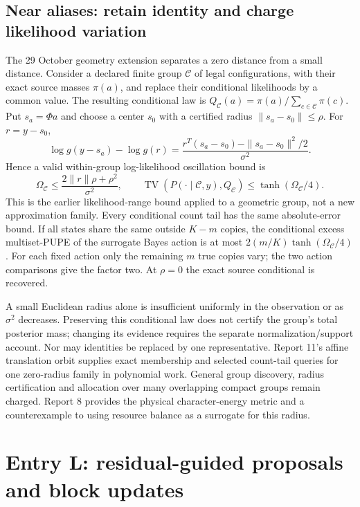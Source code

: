 \documentclass[10pt,a4paper]{article}
\newcommand{\TV}{\operatorname{TV}}
\begin{document}
\subsection{Near aliases: retain identity and charge likelihood variation}
The 29 October geometry extension separates a zero distance from a small distance. Consider a declared
finite group $\mathcal C$ of legal configurations, with their exact source masses $\pi(a)$, and replace
their conditional likelihoods by a common value. The resulting conditional law is
$Q_{\mathcal C}(a)=\pi(a)/\sum_{c\in\mathcal C}\pi(c)$. Put $s_a=\Phi a$ and choose a center $s_0$
with a certified radius $\|s_a-s_0\|\leq\rho$. For $r=y-s_0$,
\[
 \log g(y-s_a)-\log g(r)
 =\frac{r^T(s_a-s_0)-\|s_a-s_0\|^2/2}{\sigma^2}.
\]
Hence a valid within-group log-likelihood oscillation bound is
\begin{equation}
 \Omega_{\mathcal C}\leq\frac{2\|r\|\rho+\rho^2}{\sigma^2},\qquad
 \TV(P(\cdot\mid\mathcal C,y),Q_{\mathcal C})
 \leq\tanh(\Omega_{\mathcal C}/4).
 \label{eq:near-alias-conditional}
\end{equation}
This is the earlier likelihood-range bound applied to a geometric group, not a new approximation family.
Every conditional count tail has the same absolute-error bound. If all states share the same outside
$K-m$ copies, the conditional excess multiset-PUPE of the surrogate Bayes action is at most
$2(m/K)\tanh(\Omega_{\mathcal C}/4)$. For each fixed action only the remaining $m$ true copies vary;
the two action comparisons give the factor two. At $\rho=0$ the exact source conditional is recovered.

A small Euclidean radius alone is insufficient uniformly in the observation or as $\sigma^2$ decreases.
Preserving this conditional law does not certify the group's total posterior mass; changing its evidence
requires the separate normalization/support account. Nor may identities be replaced by one representative.
Report 11's affine translation orbit supplies exact membership and selected count-tail queries for one
zero-radius family in polynomial work. General group discovery, radius certification and allocation over
many overlapping compact groups remain charged. Report 8 provides the physical character-energy metric
and a counterexample to using resource balance as a surrogate for this radius.

\clearpage
\section{Entry L: residual-guided proposals and block updates}
\label{sec:guided-decoder}
\end{document}
